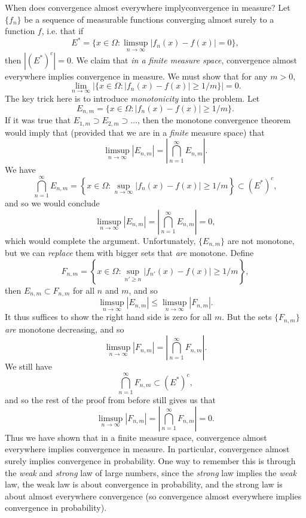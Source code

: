 \documentclass[answers]{exam}
\begin{document}
\begin{questions}
When does convergence almost everywhere implyconvergence in measure? Let $\{ f_n \}$ be a sequence of measurable functions converging almost surely to a function $f$, i.e. that if
%
\[ E^* = \{ x \in \Omega : \limsup_{n \to \infty} |f_n(x) - f(x)| = 0 \}, \]
%
then $|(E^*)^c| = 0$. We claim that \emph{in a finite measure space}, convergence almost everywhere implies convergence in measure. We must show that for any $m > 0$,
%
\[ \lim_{n \to \infty} \Big| \{ x \in \Omega : |f_n(x) - f(x)| \geq 1/m \} \Big| = 0. \]
%
The key trick here is to introduce \emph{monotonicity} into the problem. Let
%
\[ E_{n,m} = \{ x \in \Omega : |f_n(x) - f(x)| \geq 1/m \}. \]
%
If it was true that $E_{1,m} \supset E_{2,m} \supset \dots$, then the monotone convergence theorem would imply that (provided that we are in a \emph{finite} measure space) that
%
\[ \limsup_{n \to \infty} |E_{n,m}| = \left| \bigcap_{n = 1}^\infty E_{n,m} \right|. \]
%
We have
%
\[ \bigcap_{n = 1}^\infty E_{n,m} = \left\{ x \in \Omega : \sup_{n \to \infty} |f_n(x) - f(x)| \geq 1/m \right\} \subset (E^*)^c, \]
%
and so we would conclude
%
\[ \limsup_{n \to \infty} |E_{n,m}| = \left| \bigcap_{n = 1}^\infty E_{n,m} \right| = 0, \]
%
which would complete the argument. Unfortunately, $\{ E_{n,m} \}$ are not monotone, but we can \emph{replace} them with bigger sets that \emph{are} monotone. Define
%
\[ F_{n,m} = \left\{ x \in \Omega: \sup_{n' \geq n} |f_{n'}(x) - f(x)| \geq 1/m \right\}, \]
%
then $E_{n,m} \subset F_{n,m}$ for all $n$ and $m$, and so
%
\[ \limsup_{n \to \infty} |E_{n,m}| \leq \limsup_{n \to \infty} |F_{n,m}|. \]
%
It thus suffices to show the right hand side is zero for all $m$. But the sets $\{ F_{n,m} \}$ \emph{are} monotone decreasing, and so
%
\[ \limsup_{n \to \infty} |F_{n,m}| = \left| \bigcap_{n = 1}^\infty F_{n,m} \right|. \]
%
We still have
%
\[ \bigcap_{n = 1}^\infty F_{n,m} \subset (E^*)^c, \]
%
and so the rest of the proof from before still gives us that
%
\[ \limsup_{n \to \infty} |F_{n,m}| = \left| \bigcap_{n = 1}^\infty F_{n,m} \right| = 0. \]
%
Thus we have shown that in a finite measure space, convergence almost everywhere implies convergence in measure. In particular, convergence almost surely implies convergence in probability. One way to remember this is through the \emph{weak} and \emph{strong} law of large numbers, since the \emph{strong} law implies the \emph{weak} law, the weak law is about convergence in probability, and the strong law is about almost everywhere convergence (so convergence almost everywhere implies convergence in probability).


\end{questions}
\end{document}
